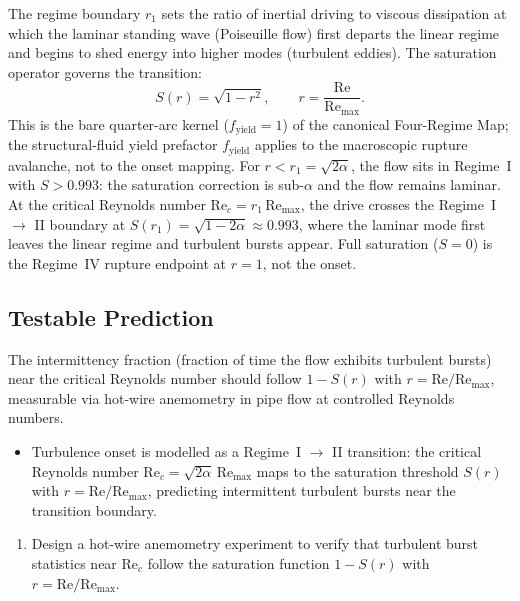 The regime boundary $r_1$ sets the ratio of inertial driving to
viscous dissipation at which the laminar standing wave (Poiseuille
flow) first departs the linear regime and begins to shed energy
into higher modes (turbulent eddies).  The saturation operator
governs the transition:
\begin{equation}
  S(r) = \sqrt{1 - r^2}, \qquad r = \frac{\mathrm{Re}}{\mathrm{Re}_{\max}}.
\end{equation}
This is the bare quarter-arc kernel ($f_{\text{yield}} = 1$) of the
canonical Four-Regime Map; the structural-fluid yield prefactor
$f_{\text{yield}}$ applies to the macroscopic rupture avalanche, not
to the onset mapping.
For $r < r_1 = \sqrt{2\alpha}$, the flow sits in Regime~I with
$S > 0.993$: the saturation correction is sub-$\alpha$ and the flow
remains laminar.  At the critical Reynolds number
$\mathrm{Re}_c = r_1 \, \mathrm{Re}_{\max}$, the drive crosses the
Regime~I $\to$ II boundary at $S(r_1) = \sqrt{1 - 2\alpha} \approx 0.993$,
where the laminar mode first leaves the linear regime and turbulent
bursts appear.  Full saturation ($S = 0$) is the Regime~IV rupture
endpoint at $r = 1$, not the onset.

\subsection{Testable Prediction}

The intermittency fraction (fraction of time the flow exhibits
turbulent bursts) near the critical Reynolds number should follow
$1 - S(r)$ with $r = \mathrm{Re}/\mathrm{Re}_{\max}$, measurable via
hot-wire anemometry in pipe flow at controlled Reynolds numbers.

\begin{summarybox}
\begin{itemize}
    \item Turbulence onset is modelled as a Regime~I $\to$ II transition: the critical Reynolds number $\mathrm{Re}_c = \sqrt{2\alpha}\,\mathrm{Re}_{\max}$ maps to the saturation threshold $S(r)$ with $r = \mathrm{Re}/\mathrm{Re}_{\max}$, predicting intermittent turbulent bursts near the transition boundary.
\end{itemize}
\end{summarybox}

\begin{exercisebox}
\begin{enumerate}
    \item Design a hot-wire anemometry experiment to verify that turbulent burst statistics near $\mathrm{Re}_c$ follow the saturation function $1 - S(r)$ with $r = \mathrm{Re}/\mathrm{Re}_{\max}$.
\end{enumerate}
\end{exercisebox}

